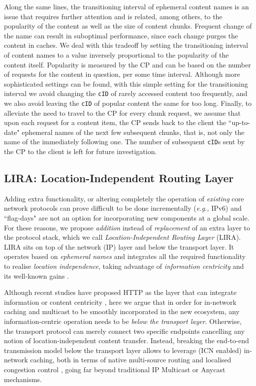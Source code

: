 \documentclass{sig-alternate}
\newcommand{\eg}{{\em e.g.,\/ }}
\begin{document}
Along the same lines, the transitioning interval of ephemeral content names is an issue that requires further attention and is related, among others, to the popularity of the content as well as the size of content chunks. Frequent change of the name can result in suboptimal performance, since each change purges the content in caches. We deal with this tradeoff by setting the transitioning interval of content names to a value inversely proportional to the popularity of the content itself. Popularity is measured by the CP and can be based on the number of requests for the content in question, per some time interval. Although more sophisticated settings can be found, with this simple setting for the transitioning interval we avoid changing the \texttt{cID} of rarely accessed content too frequently, and we also avoid leaving the \texttt{cID} of popular content the same for too long. 
Finally, to alleviate the need to travel to the CP for every chunk request, we assume that upon each request for a content item, the CP sends back to the client the ``up-to-date" ephemeral names of the next few subsequent chunks, that is, not only the name of the immediately following one. The number of subsequent \texttt{cID}s sent by the CP to the client is left for future investigation.




\subsection{LIRA: Location-Independent Routing Layer}\label{cc:cl}

Adding extra functionality, or altering completely the operation of \textit{existing} core network protocols can prove difficult to be done incrementally (\eg IPv6) and ``flag-days" are not an option for incorporating new components at a global scale. For these reasons, we propose \textit{addition} instead of \textit{replacement} of an extra layer to the protocol stack, which we call \textit{Location-Independent Routing Layer} (LIRA). LIRA sits on top of the network (IP) layer and below the transport layer. It operates based on \textit{ephemeral names} and integrates all the required functionality to realise \textit{location independence}, taking advantage of \textit{information centricity} and its well-known gains \cite{surveyICN}.

Although recent studies have proposed HTTP as the layer that can integrate information or content centricity \cite{http-narrow-waist}, here we argue that in order for in-network caching and multicast to be smoothly incorporated in the new ecosystem, any information-centric operation needs to be \textit{below the transport layer}. Otherwise, the transport protocol can merely connect two specific endpoints cancelling any notion of location-independent content transfer. Instead, breaking the end-to-end transmission model below the transport layer allows to leverage (ICN enabled) in-network caching, both in terms of native multi-source routing and localised congestion control \cite{inrpp-hotnets-ipsaras}, going far beyond traditional IP Multicast or Anycast mechanisms.
\end{document}
